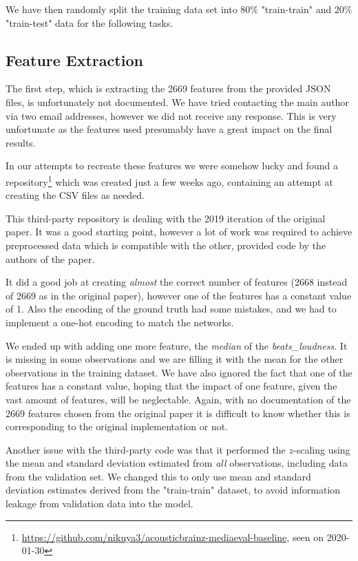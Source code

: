 \documentclass[sigconf,nonacm]{acmart}
\begin{document}
We have then randomly split the training data set into 80\%
"train-train" and 20\% "train-test" data for the following tasks.

\subsection{Feature Extraction}

The first step, which is extracting the 2669 features from the provided
JSON files, is unfortunately not documented.
We have tried contacting the main author via two email addresses,
however we did not receive any response.
This is very unfortunate as the features used presumably have a great
impact on the final results.

In our attempts to recreate these features
we were somehow lucky and found a
repository\footnote{\url{https://github.com/nikuya3/acousticbrainz-mediaeval-baseline}, seen on 2020-01-30}
which was created just a few weeks ago, containing an
attempt at creating the CSV files as needed.

This third-party repository is dealing with the 2019 iteration
of the original paper.
It was a good starting point, however a lot of
work was required to achieve preprocessed data which is
compatible with the other, provided code by the authors of the paper.

It did a good job at creating \emph{almost} the correct number
of features (2668 instead of 2669 as in the original paper),
however one of the features has a constant value of 1.
Also the encoding of the ground truth had some mistakes, and we
had to implement a one-hot encoding to match the networks.

We ended up with adding one more feature, the \emph{median}
of the \emph{beats\_loudness}.
It is missing in some observations and we are filling it with the mean
for the other observations in the training dataset.
We have also ignored the fact that one of the features has a constant value,
hoping that the impact of one feature, given the vast amount of features,
will be neglectable.
Again, with no documentation of the 2669 features chosen from the original
paper it is difficult to know whether this is corresponding to the
original implementation or not.

Another issue with the third-party code was that it performed the
$z$-scaling using the mean and standard deviation estimated
from \emph{all} observations,
including data from the validation set.
We changed this to only use mean and standard deviation estimates
derived from the "train-train" dataset, to avoid information
leakage from validation data into the model.
\end{document}
